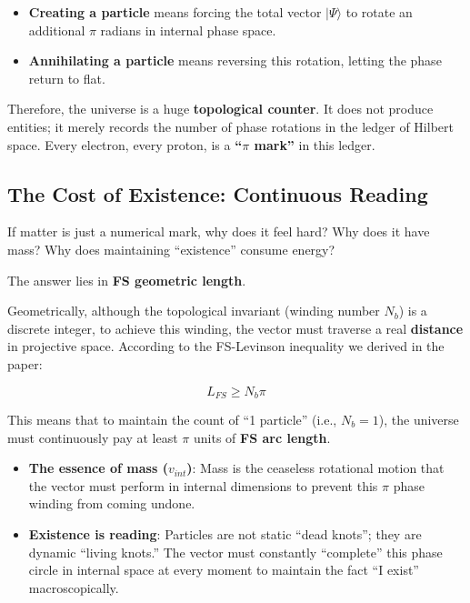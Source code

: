 \begin{itemize}
\item \textbf{Creating a particle} means forcing the total vector $|\Psi\rangle$ to rotate an additional \textbf{$\pi$} radians in internal phase space.

\item \textbf{Annihilating a particle} means reversing this rotation, letting the phase return to flat.
\end{itemize}

Therefore, the universe is a huge \textbf{topological counter}. It does not produce entities; it merely records the number of phase rotations in the ledger of Hilbert space. Every electron, every proton, is a \textbf{``$\pi$ mark''} in this ledger.

\subsection{The Cost of Existence: Continuous Reading}

If matter is just a numerical mark, why does it feel hard? Why does it have mass? Why does maintaining ``existence'' consume energy?

The answer lies in \textbf{FS geometric length}.

Geometrically, although the topological invariant (winding number $N_b$) is a discrete integer, to achieve this winding, the vector must traverse a real \textbf{distance} in projective space. According to the FS-Levinson inequality we derived in the paper:

\[L_{FS} \ge N_b \pi\]

This means that to maintain the count of ``1 particle'' (i.e., $N_b=1$), the universe must continuously pay at least \textbf{$\pi$} units of \textbf{FS arc length}.

\begin{itemize}
\item \textbf{The essence of mass ($v_{int}$)}: Mass is the ceaseless rotational motion that the vector must perform in internal dimensions to prevent this $\pi$ phase winding from coming undone.

\item \textbf{Existence is reading}: Particles are not static ``dead knots''; they are dynamic ``living knots.'' The vector must constantly ``complete'' this phase circle in internal space at every moment to maintain the fact ``I exist'' macroscopically.
\end{itemize}

